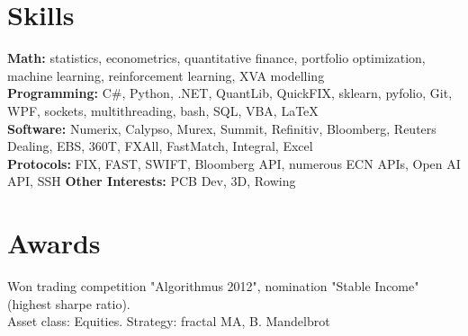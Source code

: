 \documentclass[letterpaper,hidelinks]{article}
\newcommand{\resumeSubHeadingListStart}{\begin{itemize}[leftmargin=0.1in, label={}]}
\newcommand{\resumeSubHeadingListEnd}{\end{itemize}}
\begin{document}
\vspace{-11pt}
\section{Skills}
\resumeSubHeadingListStart
\small{\item{
              \textbf{{Math:}}{ statistics, econometrics, quantitative finance, portfolio optimization, machine learning, reinforcement learning, XVA modelling\\} %
              \textbf{{Programming:}}{ C\#, Python, .NET, QuantLib, QuickFIX, sklearn, pyfolio, Git, WPF, sockets, multithreading, bash, SQL, VBA, \LaTeX\\} %
              \textbf{{Software:}}{ Numerix, Calypso, Murex, Summit, Refinitiv, Bloomberg, Reuters Dealing, EBS, 360T, FXAll, FastMatch, Integral, Excel\\} %
              \textbf{{Protocols:}}{ FIX, FAST, SWIFT, Bloomberg API, numerous ECN APIs, Open AI API, SSH } %
              \textbf{{Other Interests:}}{ PCB Dev, 3D, Rowing} %
        }}

\resumeSubHeadingListEnd
\vspace{-12pt}
\section{Awards}
\begin{description}%
  \item{Won trading competition "Algorithmus 2012", nomination "Stable Income" (highest sharpe ratio). \\Asset class: Equities. Strategy: fractal MA, B. Mandelbrot}  
\vspace{-4pt}
\end{description}
\end{document}

